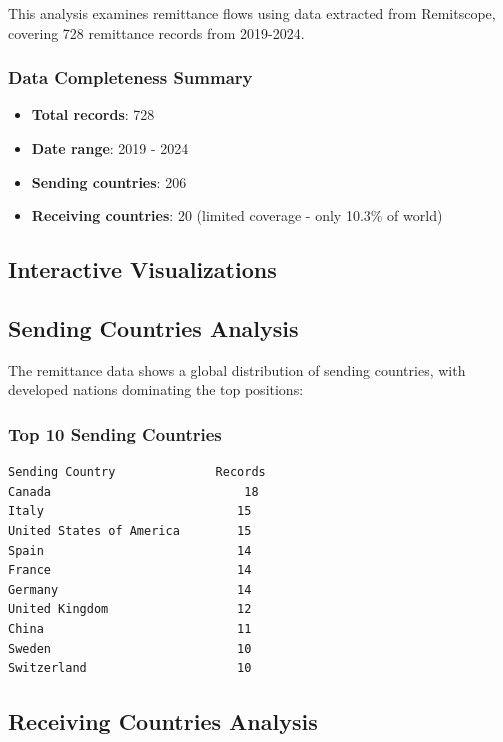 \documentclass[
  11pt,
]{article}
\providecommand{\tightlist}{%
  \setlength{\itemsep}{0pt}\setlength{\parskip}{0pt}}\usepackage{longtable,booktabs,array}
\begin{document}
This analysis examines remittance flows using data extracted from
Remitscope, covering 728 remittance records from 2019-2024.

\subsubsection{Data Completeness
Summary}\label{data-completeness-summary}

\begin{itemize}
\tightlist
\item
  \textbf{Total records}: 728
\item
  \textbf{Date range}: 2019 - 2024
\item
  \textbf{Sending countries}: 206
\item
  \textbf{Receiving countries}: 20 (limited coverage - only 10.3\% of
  world)
\end{itemize}

\subsection{Interactive
Visualizations}\label{interactive-visualizations}

\subsection{Sending Countries
Analysis}\label{sending-countries-analysis}

The remittance data shows a global distribution of sending countries,
with developed nations dominating the top positions:

\subsubsection{Top 10 Sending Countries}\label{top-10-sending-countries}

\begin{verbatim}
Sending Country              Records
Canada                           18
Italy                           15  
United States of America        15
Spain                           14
France                          14
Germany                         14
United Kingdom                  12
China                           11
Sweden                          10
Switzerland                     10
\end{verbatim}

\subsection{Receiving Countries
Analysis}\label{receiving-countries-analysis}
\end{document}
